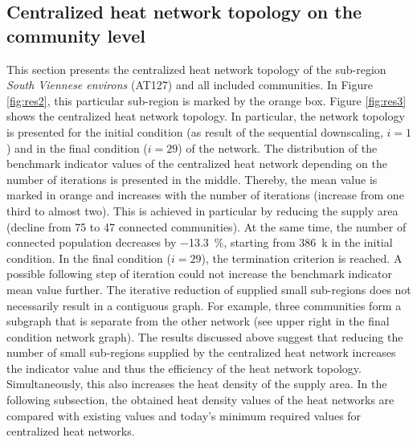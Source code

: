 \subsection{Centralized heat network topology on the community level}\label{res:4}
This section presents the centralized heat network topology of the sub-region \textit{South Viennese environs} (AT127) and all included communities. In Figure \ref{fig:res2}, this particular sub-region is marked by the orange box. Figure \ref{fig:res3} shows the centralized heat network topology. In particular, the network topology is presented for the initial condition (as result of the sequential downscaling, $i=1$) and in the final condition ($i=29$) of the network. The distribution of the benchmark indicator values of the centralized heat network depending on the number of iterations is presented in the middle. Thereby, the mean value is marked in orange and increases with the number of iterations (increase from one third to almost two). This is achieved in particular by reducing the supply area (decline from 75 to 47 connected communities). At the same time, the number of connected population decreases by \SI{-13.3}{\%}, starting from \SI{386}{k} in the initial condition. In the final condition ($i=29$), the termination criterion is reached. A possible following step of iteration could not increase the benchmark indicator mean value further. The iterative reduction of supplied small sub-regions does not necessarily result in a contiguous graph. For example, three communities form a subgraph that is separate from the other network (see upper right in the final condition network graph). The results discussed above suggest that reducing the number of small sub-regions supplied by the centralized heat network increases the indicator value and thus the efficiency of the heat network topology. Simultaneously, this also increases the heat density of the supply area. In the following subsection, the obtained heat density values of the heat networks are compared with existing values and today's minimum required values for centralized heat networks.

